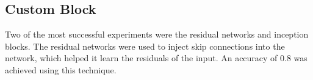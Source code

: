 \documentclass[11pt]{article}
\begin{document}
\begin{multicols}{2}




      \section{Custom Block}

      Two of the most successful experiments were the residual networks and
      inception blocks. The residual networks were used to inject skip
      connections into the network, which helped it learn the residuals of the
      input. An accuracy of 0.8 was achieved using this technique.


\end{multicols}
\end{document}
